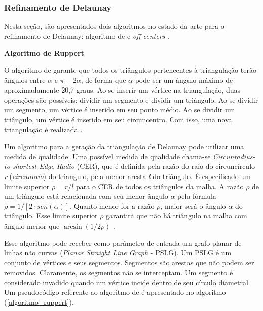 \subsubsection {Refinamento de Delaunay} 
\label{cap_algoritmos_refinamento}
Nesta seção, são apresentados dois algoritmos no estado da arte para o refinamento de Delaunay: algoritmo de  e \emph{off-centers} \cite{Ungor2004, Ungor2009, Oliveira2012a}.


\textbf {Algoritmo de Ruppert}
\label{cap_algoritmo_ruppert}

O algoritmo de  garante que todos os triângulos pertencentes à triangulação terão ângulos entre $\alpha$ e $\pi-2\alpha$, de forma que $\alpha$ pode ser um ângulo máximo de aproximadamente 20,7 graus. Ao se inserir um vértice na triangulação, duas operações são possíveis: dividir um segmento e dividir um triângulo. Ao se dividir um segmento, um vértice é inserido em seu ponto médio. Ao se dividir um triângulo, um vértice é inserido em seu circuncentro. Com isso, uma nova triangulação é realizada \cite{Oliveira2012a}. 

Um algoritmo para a geração da triangulação de Delaunay pode utilizar uma medida de qualidade. Uma possível medida de qualidade chama-se \emph{Circunradius-to-shortest Edge Radio} (CER), que é definida pela razão do raio do circuncírculo \emph{r} (\emph{circunraio}) do triangulo, pela menor aresta \emph{l} do triângulo. É especificado um limite superior $\rho=r/l$ para o CER de todos os triângulos da malha. A razão $\rho$ de um triângulo está relacionada com seu menor ângulo ${\alpha}$ pela fórmula ${\rho = 1/[2\cdot sen(\alpha)]}$. Quanto menor for a razão $\rho$, maior será o ângulo $\alpha$ do triângulo. Esse limite superior $\rho$ garantirá que não há triângulo na malha com ângulo menor que ${\arcsin(1/2\rho)}$ \cite{Pebay2003}. 

Esse algoritmo pode receber como parâmetro de entrada um grafo planar de linhas não curvas (\emph {Planar Straight Line Graph} - PSLG). Um PSLG é um conjunto de vértices e seus segmentos. Segmentos são arestas que não podem ser removidos. Claramente, os segmentos não se interceptam. Um segmento é considerado invadido quando um vértice incide dentro de seu círculo diametral. Um pseudocódigo referente ao algoritmo de  é apresentado no algoritmo (\ref{algoritmo_ruppert}).

